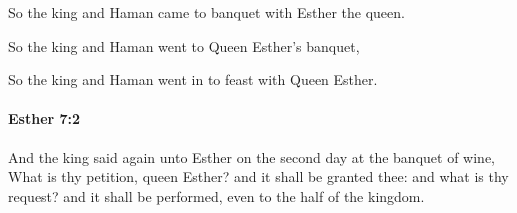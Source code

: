			\begin{versebox}
					\item[BHS] 
					\item[LXX] 
					\item[ASV] So the king and Haman came to banquet with Esther the queen.
					\item[NIV] So the king and Haman went to Queen Esther’s banquet,
					\item[NRSV] So the king and Haman went in to feast with Queen Esther.
			\end{versebox}

		\paragraph{Esther 7:2} %
			\label{ESTHER-7-2}

			And the king said again unto Esther on the second day at the banquet of wine, What is thy petition, queen Esther? and it shall be granted thee: and what is thy request? and it shall be performed, even to the half of the kingdom.

